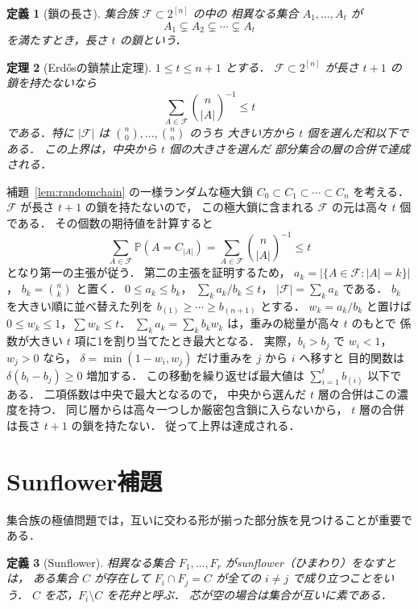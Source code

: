 \documentclass[a5paper,10pt,onecolumn]{jsarticle}
\makeatletter
\theoremstyle{mathnotetheorem}
\newtheorem{theorem}{定理}[section]
\newtheorem{definition}[theorem]{定義}
\renewcommand{\proofname}{証明}
\renewenvironment{proof}[1][\proofname]{%
  \par\pushQED{\qed}\normalfont\topsep4\p@\@plus2\p@\relax
  \trivlist\item[\hskip\labelsep\bfseries #1]\ignorespaces
}{\popQED\endtrivlist\@endpefalse}
\makeatother
\begin{document}
\begin{definition}[鎖の長さ]
集合族 $\mathcal F\subset2^{[n]}$ の中の
相異なる集合 $A_1,\ldots,A_t$ が
\[
 A_1\subsetneq A_2\subsetneq\cdots\subsetneq A_t
\]
を満たすとき，長さ $t$ の鎖という．
\end{definition}

\begin{theorem}[Erd\H{o}sの鎖禁止定理]\label{thm:chainfree}
$1\le t\le n+1$ とする．
$\mathcal F\subset2^{[n]}$ が長さ $t+1$ の鎖を持たないなら
\begin{equation}\label{eq:chainlym}
 \sum_{A\in\mathcal F}{n\choose|A|}^{-1}\le t
\end{equation}
である．特に $|\mathcal F|$ は
${n\choose0},\ldots,{n\choose n}$ のうち
大きい方から $t$ 個を選んだ和以下である．
この上界は，中央から $t$ 個の大きさを選んだ
部分集合の層の合併で達成される．
\end{theorem}
\begin{proof}
補題~\ref{lem:randomchain} の一様ランダムな極大鎖
$C_0\subset C_1\subset\cdots\subset C_n$ を考える．
$\mathcal F$ が長さ $t+1$ の鎖を持たないので，
この極大鎖に含まれる $\mathcal F$ の元は高々 $t$ 個である．
その個数の期待値を計算すると
\[
 \sum_{A\in\mathcal F}\mathbb P(A=C_{|A|})
 =\sum_{A\in\mathcal F}{n\choose|A|}^{-1}\le t
\]
となり第一の主張が従う．
第二の主張を証明するため，
$a_k=|\{A\in\mathcal F:|A|=k\}|$，
$b_k={n\choose k}$ と置く．
$0\le a_k\le b_k$，
$\sum_k a_k/b_k\le t$，
$|\mathcal F|=\sum_k a_k$ である．
$b_k$ を大きい順に並べ替えた列を
$b_{(1)}\ge\cdots\ge b_{(n+1)}$ とする．
$w_k=a_k/b_k$ と置けば $0\le w_k\le1$，$\sum w_k\le t$．
$\sum_k a_k=\sum_k b_kw_k$ は，重みの総量が高々 $t$ のもとで
係数が大きい $t$ 項に1を割り当てたとき最大となる．
実際，$b_i>b_j$ で $w_i<1$，$w_j>0$ なら，
$\delta=\min(1-w_i,w_j)$ だけ重みを $j$ から $i$ へ移すと
目的関数は $\delta(b_i-b_j)\ge0$ 増加する．
この移動を繰り返せば最大値は
$\sum_{i=1}^t b_{(i)}$ 以下である．
二項係数は中央で最大となるので，
中央から選んだ $t$ 層の合併はこの濃度を持つ．
同じ層からは高々一つしか厳密包含鎖に入らないから，
$t$ 層の合併は長さ $t+1$ の鎖を持たない．
従って上界は達成される．
\end{proof}

\section{Sunflower補題}
集合族の極値問題では，互いに交わる形が揃った部分族を見つけることが重要である．

\begin{definition}[Sunflower]
相異なる集合 $F_1,\ldots,F_r$ が\emph{sunflower}（ひまわり）をなすとは，
ある集合 $C$ が存在して
$F_i\cap F_j=C$ が全ての $i\ne j$ で成り立つことをいう．
$C$ を芯，$F_i\setminus C$ を花弁と呼ぶ．
芯が空の場合は集合が互いに素である．
\end{definition}
\end{document}
